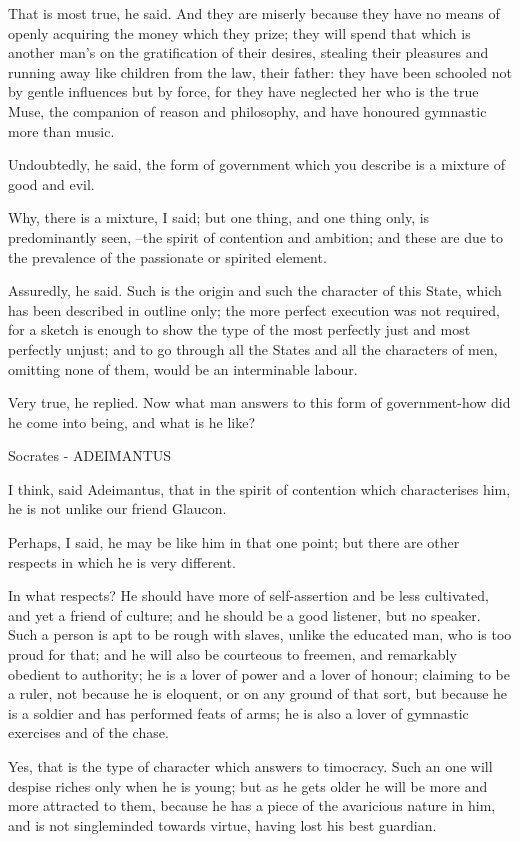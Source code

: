 That is most true, he said.
And they are miserly because they have no means of openly acquiring the money which they prize; they will spend that which is another man's on the gratification of their desires, stealing their pleasures and running away like children from the law, their father: they have been schooled not by gentle influences but by force, for they have neglected her who is the true Muse, the companion of reason and philosophy, and have honoured gymnastic more than music.

Undoubtedly, he said, the form of government which you describe is a mixture of good and evil.

Why, there is a mixture, I said; but one thing, and one thing only, is predominantly seen, --the spirit of contention and ambition; and these are due to the prevalence of the passionate or spirited element.

Assuredly, he said.
Such is the origin and such the character of this State, which has been described in outline only; the more perfect execution was not required, for a sketch is enough to show the type of the most perfectly just and most perfectly unjust; and to go through all the States and all the characters of men, omitting none of them, would be an interminable labour.

Very true, he replied.
Now what man answers to this form of government-how did he come into being, and what is he like?

Socrates - ADEIMANTUS

I think, said Adeimantus, that in the spirit of contention which characterises him, he is not unlike our friend Glaucon.

Perhaps, I said, he may be like him in that one point; but there are other respects in which he is very different.

In what respects?
He should have more of self-assertion and be less cultivated, and yet a friend of culture; and he should be a good listener, but no speaker. Such a person is apt to be rough with slaves, unlike the educated man, who is too proud for that; and he will also be courteous to freemen, and remarkably obedient to authority; he is a lover of power and a lover of honour; claiming to be a ruler, not because he is eloquent, or on any ground of that sort, but because he is a soldier and has performed feats of arms; he is also a lover of gymnastic exercises and of the chase.

Yes, that is the type of character which answers to timocracy.
Such an one will despise riches only when he is young; but as he gets older he will be more and more attracted to them, because he has a piece of the avaricious nature in him, and is not singleminded towards virtue, having lost his best guardian.

